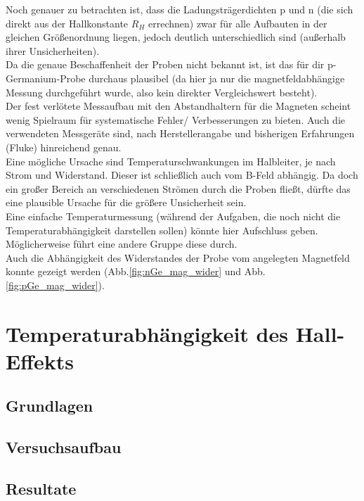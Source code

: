 \documentclass[12pt,a4paper]{article}
\begin{document}
\begin{multicols}{2}
Noch genauer zu betrachten ist, dass die Ladungsträgerdichten p und n (die sich direkt aus der Hallkonstante $R_H$ errechnen) zwar für alle Aufbauten in der gleichen Größenordnung liegen, jedoch deutlich unterschiedlich sind (außerhalb ihrer Unsicherheiten).\\
Da die genaue Beschaffenheit der Proben nicht bekannt ist, ist das für dir p-Germanium-Probe durchaus plausibel (da hier ja nur die magnetfeldabhängige Messung durchgeführt wurde, also kein direkter Vergleichswert besteht).\\
Der fest verlötete Messaufbau mit den Abstandhaltern für die Magneten scheint wenig Spielraum für systematische Fehler/ Verbesserungen zu bieten. Auch die verwendeten Messgeräte sind, nach Herstellerangabe und bisherigen Erfahrungen (Fluke) hinreichend genau.\\
Eine mögliche Ursache sind Temperaturschwankungen im Halbleiter, je nach Strom und Widerstand. Dieser ist schließlich auch vom B-Feld abhängig. Da doch ein großer Bereich an verschiedenen Strömen durch die Proben fließt, dürfte das eine plausible Ursache für die größere Unsicherheit sein.\\
Eine einfache Temperaturmessung (während der Aufgaben, die noch nicht die Temperaturabhängigkeit darstellen sollen) könnte hier Aufschluss geben. Möglicherweise führt eine andere Gruppe diese durch.\\

Auch die Abhängigkeit des Widerstandes der Probe vom angelegten Magnetfeld konnte gezeigt werden (Abb.\ref{fig:nGe_mag_wider} und Abb. \ref{fig:pGe_mag_wider}).\\

\section{Temperaturabhängigkeit des Hall-Effekts}

\subsection{Grundlagen}

\subsection{Versuchsaufbau}

\subsection{Resultate}



\end{multicols}
\end{document}
